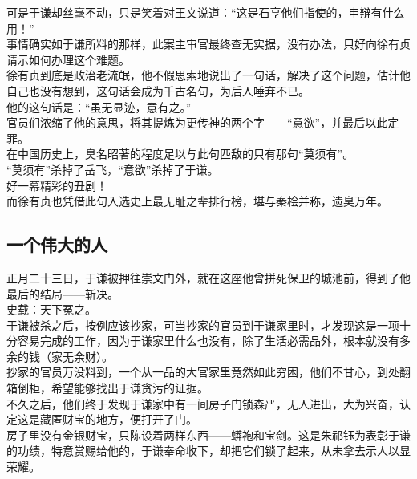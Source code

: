 \begin{multicols}{\theparacolNo}
可是于谦却丝毫不动，只是笑着对王文说道：“这是石亨他们指使的，申辩有什么用！”\\

事情确实如于谦所料的那样，此案主审官最终查无实据，没有办法，只好向徐有贞请示如何办理这个难题。\\

徐有贞到底是政治老流氓，他不假思索地说出了一句话，解决了这个问题，估计他自己也没有想到，这句话会成为千古名句，为后人唾弃不已。\\

他的这句话是：“虽无显迹，意有之。”\\

官员们浓缩了他的意思，将其提炼为更传神的两个字——“意欲”，并最后以此定罪。\\

在中国历史上，臭名昭著的程度足以与此句匹敌的只有那句“莫须有”。\\

“莫须有”杀掉了岳飞，“意欲”杀掉了于谦。\\

好一幕精彩的丑剧！\\

而徐有贞也凭借此句入选史上最无耻之辈排行榜，堪与秦桧并称，遗臭万年。\\

\subsection{一个伟大的人}
正月二十三日，于谦被押往崇文门外，就在这座他曾拼死保卫的城池前，得到了他最后的结局——斩决。\\

史载：天下冤之。\\

于谦被杀之后，按例应该抄家，可当抄家的官员到于谦家里时，才发现这是一项十分容易完成的工作，因为于谦家里什么也没有，除了生活必需品外，根本就没有多余的钱（家无余财）。\\

抄家的官员万没料到，一个从一品的大官家里竟然如此穷困，他们不甘心，到处翻箱倒柜，希望能够找出于谦贪污的证据。\\

不久之后，他们终于发现于谦家中有一间房子门锁森严，无人进出，大为兴奋，认定这是藏匿财宝的地方，便打开了门。\\

房子里没有金银财宝，只陈设着两样东西——蟒袍和宝剑。这是朱祁钰为表彰于谦的功绩，特意赏赐给他的，于谦奉命收下，却把它们锁了起来，从未拿去示人以显荣耀。\\


\end{multicols}
